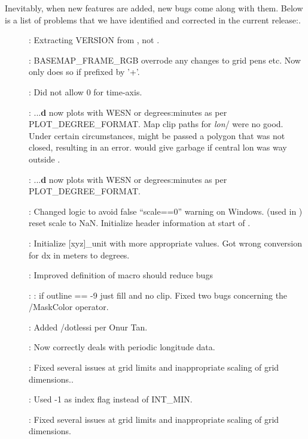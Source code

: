 Inevitably, when new features are added, new bugs come along with them.  Below is a list of problems
that we have identified and corrected in the current release:.

\begin{description}
\item []: Extracting VERSION from , not .
\item []: BASEMAP\_FRAME\_RGB overrode any changes to grid pens etc.  Now only
does so if prefixed by '+'.
\item []: Did not allow 0 for time-axis.
\item []: ...\textbf{d} now plots with WESN or degrees:minutes as per PLOT\_DEGREE\_FORMAT.
Map clip paths for \emph{lon}/ were no good.  Under certain circumstances,  might be passed
a polygon that was not closed, resulting in an error.   would give garbage if central lon was way outside .
\item []: ...\textbf{d} now plots with WESN or degrees:minutes as per PLOT\_DEGREE\_FORMAT.
\item []: Changed logic to avoid false ``scale==0'' warning on Windows.
 (used in ) reset scale to NaN.
Initialize header information at start of .
\item []: Initialize [xyz]\_unit with more appropriate values.
Got wrong conversion for dx in meters to degrees.
\item []: Improved definition of  macro should reduce bugs
\item []: : if outline == -9 just fill and no clip.
Fixed two bugs concerning the /MaskColor operator.
\item []: Added /dotlessi per Onur Tan.
\item []: Now correctly deals with periodic longitude data.
\item []: Fixed several issues at grid limits and inappropriate scaling of grid dimensions..
\item []: Used -1 as index flag instead of INT\_MIN.
\item []: Fixed several issues at grid limits and inappropriate scaling of grid dimensions.

\end{description}

